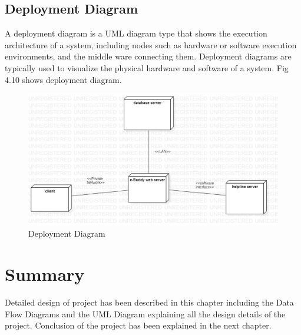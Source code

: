 \subsection{Deployment Diagram}
A deployment diagram is a UML diagram type that shows the execution architecture of a system, including nodes such as hardware or software execution environments, and the middle ware connecting them. Deployment diagrams are typically used to visualize the physical hardware and software of a system. Fig 4.10 shows deployment diagram.
\begin{figure}[H]
    \centering
    \includegraphics[scale=0.45]{design/DeploymentDiagram1.png}
    \caption{Deployment Diagram}
    \label{fig:my_label}
\end{figure}

\section{Summary}
Detailed design of project has been described in this chapter including the Data Flow Diagrams and the UML Diagram explaining all the design details of the project. Conclusion of the project has been explained in the next chapter. 